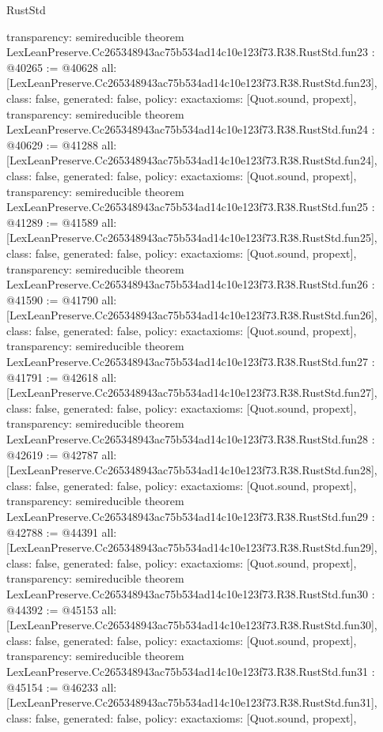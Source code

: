 \begin{lexlean}{RustStd}
\begin{coremodule}
{  transparency: semireducible
}
theorem LexLeanPreserve.Cc265348943ac75b534ad14c10e123f73.R38.RustStd.fun23 : @40265 := @40628 {
  all: [LexLeanPreserve.Cc265348943ac75b534ad14c10e123f73.R38.RustStd.fun23],
  class: false,
  generated: false,
  policy: exact{axioms: [Quot.sound, propext]},
  transparency: semireducible
}
theorem LexLeanPreserve.Cc265348943ac75b534ad14c10e123f73.R38.RustStd.fun24 : @40629 := @41288 {
  all: [LexLeanPreserve.Cc265348943ac75b534ad14c10e123f73.R38.RustStd.fun24],
  class: false,
  generated: false,
  policy: exact{axioms: [Quot.sound, propext]},
  transparency: semireducible
}
theorem LexLeanPreserve.Cc265348943ac75b534ad14c10e123f73.R38.RustStd.fun25 : @41289 := @41589 {
  all: [LexLeanPreserve.Cc265348943ac75b534ad14c10e123f73.R38.RustStd.fun25],
  class: false,
  generated: false,
  policy: exact{axioms: [Quot.sound, propext]},
  transparency: semireducible
}
theorem LexLeanPreserve.Cc265348943ac75b534ad14c10e123f73.R38.RustStd.fun26 : @41590 := @41790 {
  all: [LexLeanPreserve.Cc265348943ac75b534ad14c10e123f73.R38.RustStd.fun26],
  class: false,
  generated: false,
  policy: exact{axioms: [Quot.sound, propext]},
  transparency: semireducible
}
theorem LexLeanPreserve.Cc265348943ac75b534ad14c10e123f73.R38.RustStd.fun27 : @41791 := @42618 {
  all: [LexLeanPreserve.Cc265348943ac75b534ad14c10e123f73.R38.RustStd.fun27],
  class: false,
  generated: false,
  policy: exact{axioms: [Quot.sound, propext]},
  transparency: semireducible
}
theorem LexLeanPreserve.Cc265348943ac75b534ad14c10e123f73.R38.RustStd.fun28 : @42619 := @42787 {
  all: [LexLeanPreserve.Cc265348943ac75b534ad14c10e123f73.R38.RustStd.fun28],
  class: false,
  generated: false,
  policy: exact{axioms: [Quot.sound, propext]},
  transparency: semireducible
}
theorem LexLeanPreserve.Cc265348943ac75b534ad14c10e123f73.R38.RustStd.fun29 : @42788 := @44391 {
  all: [LexLeanPreserve.Cc265348943ac75b534ad14c10e123f73.R38.RustStd.fun29],
  class: false,
  generated: false,
  policy: exact{axioms: [Quot.sound, propext]},
  transparency: semireducible
}
theorem LexLeanPreserve.Cc265348943ac75b534ad14c10e123f73.R38.RustStd.fun30 : @44392 := @45153 {
  all: [LexLeanPreserve.Cc265348943ac75b534ad14c10e123f73.R38.RustStd.fun30],
  class: false,
  generated: false,
  policy: exact{axioms: [Quot.sound, propext]},
  transparency: semireducible
}
theorem LexLeanPreserve.Cc265348943ac75b534ad14c10e123f73.R38.RustStd.fun31 : @45154 := @46233 {
  all: [LexLeanPreserve.Cc265348943ac75b534ad14c10e123f73.R38.RustStd.fun31],
  class: false,
  generated: false,
  policy: exact{axioms: [Quot.sound, propext]},
}
\end{coremodule}
\end{lexlean}
